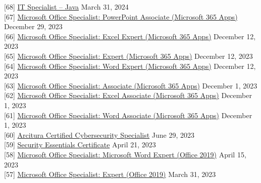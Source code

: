 \documentclass[10pt]{res} %
\begin{document}
\begin{resume}
{[68]} \phantom{0}\href{https://www.credly.com/badges/5215e627-aa45-4920-b813-ad867d8ac273}{\color{blue}IT Specialist -- Java} \hfill March 31, 2024 \\
{[67]} \phantom{0}\href{https://www.credly.com/badges/d38d5d21-a737-41df-b771-9630201ced48}{\color{blue}Microsoft Office Specialist: PowerPoint Associate (Microsoft 365 Apps)} \hfill December 29, 2023 \\
{[66]} \phantom{0}\href{https://www.credly.com/badges/ed907088-12af-4026-a535-6848bb24dd99}{\color{blue}Microsoft Office Specialist: Excel Expert (Microsoft 365 Apps)} \hfill December 12, 2023 \\
{[65]} \phantom{0}\href{https://www.credly.com/badges/1fdd94d8-3688-4589-8c3e-3ebd50a20a7c}{\color{blue}Microsoft Office Specialist: Expert (Microsoft 365 Apps)} \hfill December 12, 2023 \\
{[64]} \phantom{0}\href{https://www.credly.com/badges/12603319-2c8e-4814-83fa-2f81987ae7be}{\color{blue}Microsoft Office Specialist: Word Expert (Microsoft 365 Apps)} \hfill December 12, 2023 \\
{[63]} \phantom{0}\href{https://www.credly.com/badges/1283e774-d88f-4d58-82e9-f0545f3251e4}{\color{blue}Microsoft Office Specialist: Associate (Microsoft 365 Apps)} \hfill December 1, 2023 \\
{[62]} \phantom{0}\href{https://www.credly.com/badges/cc072ec2-bfcc-4570-927b-a3df25b662ed}{\color{blue}Microsoft Office Specialist: Excel Associate (Microsoft 365 Apps)} \hfill December 1, 2023 \\
{[61]} \phantom{0}\href{https://www.credly.com/badges/d482b31b-b2e1-4ee5-a60e-ed6aedfa9817}{\color{blue}Microsoft Office Specialist: Word Associate (Microsoft 365 Apps)} \hfill December 1, 2023 \\
{[60]} \phantom{0}\href{https://www.credly.com/badges/cc052e79-6e68-426f-b996-3ad9e1bbb9b5}{\color{blue}Arcitura Certified Cybersecurity Specialist} \hfill June 29, 2023 \\
{[59]} \phantom{0}\href{https://www.credly.com/badges/cbf5cc88-e19e-488a-aec4-eab3644d3c4a}{\color{blue}Security Essentials Certificate} \hfill April 21, 2023 \\
{[58]} \phantom{0}\href{https://www.credly.com/badges/1cbcdb86-cb92-4211-a6b3-cc062729f28f}{\color{blue}Microsoft Office Specialist: Microsoft Word Expert (Office 2019)} \hfill April 15, 2023 \\
{[57]} \phantom{0}\href{https://www.credly.com/badges/12179af5-7b97-483f-bfcf-e2937cde634f}{\color{blue}Microsoft Office Specialist: Expert (Office 2019)} \hfill March 31, 2023 \\

\end{resume}
\end{document}
